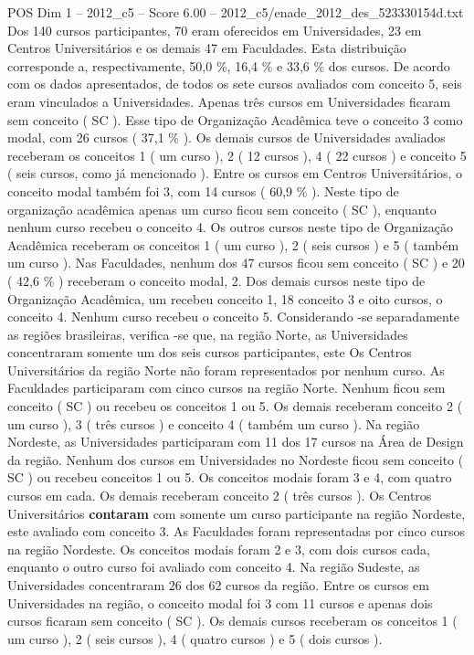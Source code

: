 \begin{textsample}{POS Dim 1 – 2012\_c5 – Score 6.00 – 2012\_c5/enade\_2012\_des\_523330154d.txt}
Dos 140 cursos participantes, 70 eram oferecidos em Universidades, 23 em Centros Universitários e os demais 47 em Faculdades.
Esta distribuição corresponde a, respectivamente, 50,0 \%, 16,4 \% e 33,6 \% dos cursos.
De acordo com os dados apresentados, de todos os sete cursos avaliados com conceito 5, seis eram vinculados a Universidades.
Apenas três cursos em Universidades ficaram sem conceito ( SC ).
Esse tipo de Organização Acadêmica teve o conceito 3 como modal, com 26 cursos ( 37,1 \% ).
Os demais cursos de Universidades avaliados receberam os conceitos 1 ( um curso ), 2 ( 12 cursos ), 4 ( 22 cursos ) e conceito 5 ( seis cursos, como já mencionado ).
Entre os cursos em Centros Universitários, o conceito modal também foi 3, com 14 cursos ( 60,9 \% ).
Neste tipo de organização acadêmica apenas um curso ficou sem conceito ( SC ), enquanto nenhum curso recebeu o conceito 4.
Os outros cursos neste tipo de Organização Acadêmica receberam os conceitos 1 ( um curso ), 2 ( seis cursos ) e 5 ( também um curso ).
Nas Faculdades, nenhum dos 47 cursos ficou sem conceito ( SC ) e 20 ( 42,6 \% ) receberam o conceito modal, 2.
Dos demais cursos neste tipo de Organização Acadêmica, um recebeu conceito 1, 18 conceito 3 e oito cursos, o conceito 4.
Nenhum curso recebeu o conceito 5.
Considerando -se separadamente as regiões brasileiras, verifica -se que, na região Norte, as Universidades concentraram somente um dos seis cursos participantes, este Os Centros Universitários da região Norte não foram representados por nenhum curso.
As Faculdades participaram com cinco cursos na região Norte.
Nenhum ficou sem conceito ( SC ) ou recebeu os conceitos 1 ou 5.
Os demais receberam conceito 2 ( um curso ), 3 ( três cursos ) e conceito 4 ( também um curso ).
Na região Nordeste, as Universidades participaram com 11 dos 17 cursos na Área de Design da região.
Nenhum dos cursos em Universidades no Nordeste ficou sem conceito ( SC ) ou recebeu conceitos 1 ou 5.
Os conceitos modais foram 3 e 4, com quatro cursos em cada.
Os demais receberam conceito 2 ( três cursos ).
Os Centros Universitários \textbf{contaram} com somente um curso participante na região Nordeste, este avaliado com conceito 3.
As Faculdades foram representadas por cinco cursos na região Nordeste.
Os conceitos modais foram 2 e 3, com dois cursos cada, enquanto o outro curso foi avaliado com conceito 4.
Na região Sudeste, as Universidades concentraram 26 dos 62 cursos da região.
Entre os cursos em Universidades na região, o conceito modal foi 3 com 11 cursos e apenas dois cursos ficaram sem conceito ( SC ).
Os demais cursos receberam os conceitos 1 ( um curso ), 2 ( seis cursos ), 4 ( quatro cursos ) e 5 ( dois cursos ).

\end{textsample}
